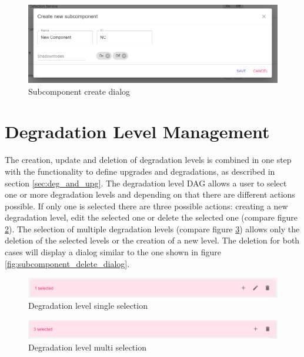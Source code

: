 \begin{figure}[ht]
    \centering
    \includegraphics[width=\textwidth]{img/subcomponents_create.png}
    \caption{Subcomponent create dialog}
    \label{fig:subcomponent_create_dialog}
\end{figure}

\section{Degradation Level Management}
The creation, update and deletion of degradation levels is combined in one step with the functionality to define upgrades and degradations, as described in section \ref{sec:deg_and_upg}. The degradation level DAG allows a user to select one or more degradation levels and depending on that there are different actions possible. If only one is selected there are three possible actions: creating a new degradation level, edit the selected one or delete the selected one (compare figure \ref{fig:degradation_crud_level_single}). The selection of multiple degradation levels (compare figure \ref{fig:degradation_crud_level_multi}) allows only the deletion of the selected levels or the creation of a new level. The deletion for both cases will display a dialog similar to the one shown in figure \ref{fig:subcomponent_delete_dialog}.

\begin{figure}[ht]
    \centering
    \includegraphics[width=\textwidth]{img/degradation_level_crud_single.PNG}
    \caption{Degradation level single selection}
    \label{fig:degradation_crud_level_single}
\end{figure}

\begin{figure}[ht]
    \centering
    \includegraphics[width=\textwidth]{img/degradation_level_crud_multi.PNG}
    \caption{Degradation level multi selection}
    \label{fig:degradation_crud_level_multi}
\end{figure}

